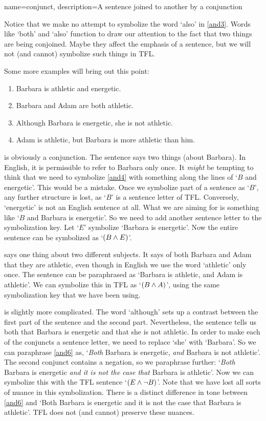 {
name=conjunct,
description={A sentence joined to another by a \gls{conjunction}}
}


Notice that we make no attempt to symbolize the word `also' in \cref*{and3}. Words like `both' and `also' function to draw our attention to the fact that two things are being conjoined. Maybe they affect the emphasis of a sentence, but we will not (and cannot) symbolize such things in TFL.

Some more examples will bring out this point:
	\begin{enumerate}
		\item\label{and4}Barbara is athletic and energetic.
		\item\label{and5}Barbara and Adam are both athletic.
		\item\label{and6}Although Barbara is energetic, she is not athletic.
	\item\label{and7}Adam is athletic, but Barbara is more athletic than him.
	\end{enumerate}
 is obviously a conjunction. The sentence says two things (about Barbara). In English, it is permissible to refer to Barbara only once. It \emph{might} be tempting to think that we need to symbolize \cref*{and4} with something along the lines of `$B$ and energetic'. This would be a mistake. Once we symbolize part of a sentence as `$B$', any further structure is lost, as `$B$' is a sentence letter of TFL. Conversely, `energetic' is not an English sentence at all. What we are aiming for is something like `$B$ and Barbara is energetic'. So we need to add another sentence letter to the symbolization key. Let `$E$' symbolize `Barbara is energetic'. Now the entire sentence can be symbolized as `$(B\wedge E)$'.

 says one thing about two different subjects. It says of both Barbara and Adam that they are athletic, even though in English we use the word `athletic' only once. The sentence can be paraphrased as `Barbara is athletic, and Adam is athletic'. We can symbolize this in TFL as `$(B\wedge A)$', using the same symbolization key that we have been using.

 is slightly more complicated. The word `although' sets up a contrast between the first part of the sentence and the second part. Nevertheless, the sentence tells us both that Barbara is energetic and that she is not athletic. In order to make each of the conjuncts a sentence letter, we need to replace `she' with `Barbara'. So we can paraphrase \cref*{and6} as, `\emph{Both} Barbara is energetic, \emph{and} Barbara is not athletic'. The second conjunct contains a negation, so we paraphrase further: `\emph{Both} Barbara is energetic \emph{and} \emph{it is not the case that} Barbara is athletic'. Now we can symbolize this with the TFL sentence `$(E\wedge\neg B)$'. Note that we have lost all sorts of nuance in this symbolization. There is a distinct difference in tone between \cref*{and6} and `Both Barbara is energetic and it is not the case that Barbara is athletic'. TFL does not (and cannot) preserve these nuances.

